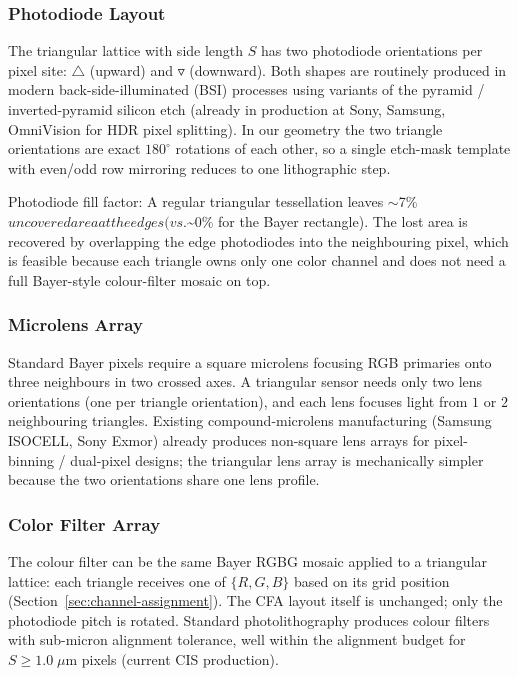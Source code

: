 \documentclass[10pt,twocolumn,letterpaper]{article}
\begin{document}
\subsubsection*{Photodiode Layout}
The triangular lattice with side length $S$ has two photodiode orientations per pixel site: $\triangle$ (upward) and $\triangledown$ (downward). Both shapes are routinely produced in modern back-side-illuminated (BSI) processes using variants of the pyramid / inverted-pyramid silicon etch (already in production at Sony, Samsung, OmniVision for HDR pixel splitting). In our geometry the two triangle orientations are exact $180^\circ$ rotations of each other, so a single etch-mask template with even/odd row mirroring reduces to one lithographic step.

Photodiode fill factor: A regular triangular tessellation leaves $\sim$7\%$ uncovered area at the edges (vs. $\sim$0\%$ for the Bayer rectangle). The lost area is recovered by overlapping the edge photodiodes into the neighbouring pixel, which is feasible because each triangle owns only one color channel and does not need a full Bayer-style colour-filter mosaic on top.

\subsubsection*{Microlens Array}
Standard Bayer pixels require a square microlens focusing RGB primaries onto three neighbours in two crossed axes. A triangular sensor needs only two lens orientations (one per triangle orientation), and each lens focuses light from $1$ or $2$ neighbouring triangles. Existing compound-microlens manufacturing (Samsung ISOCELL, Sony Exmor) already produces non-square lens arrays for pixel-binning / dual-pixel designs; the triangular lens array is mechanically simpler because the two orientations share one lens profile.

\subsubsection*{Color Filter Array}
The colour filter can be the same Bayer RGBG mosaic applied to a triangular lattice: each triangle receives one of $\{R, G, B\}$ based on its grid position (Section~\ref{sec:channel-assignment}). The CFA layout itself is unchanged; only the photodiode pitch is rotated. Standard photolithography produces colour filters with sub-micron alignment tolerance, well within the alignment budget for $S \geq 1.0\;\mu\mathrm{m}$ pixels (current CIS production).
\end{document}
